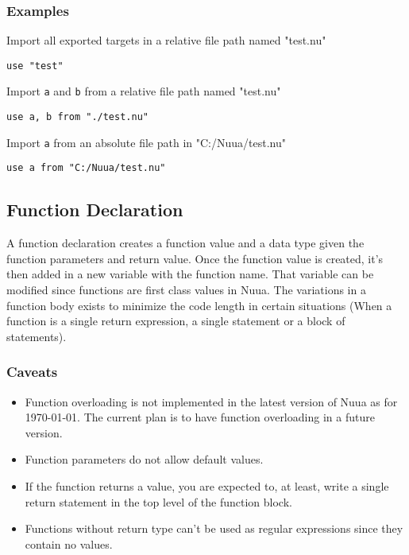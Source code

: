 \subsubsection{Examples}

Import all exported targets in a relative file path named "test.nu"
\begin{lstlisting}
use "test"
\end{lstlisting}
Import \texttt{a} and \texttt{b} from a relative file path named "test.nu"
\begin{lstlisting}
use a, b from "./test.nu"
\end{lstlisting}
Import \texttt{a} from an absolute file path in "C:/Nuua/test.nu"
\begin{lstlisting}
use a from "C:/Nuua/test.nu"
\end{lstlisting}

\subsection{Function Declaration}

A function declaration creates a function value and a data type given the function parameters and return value.
Once the function value is created, it's then added in a new variable with the function name. That variable can be
modified since functions are first class values in Nuua. The variations in a function body exists to minimize the
code length in certain situations (When a function is a single return expression, a single statement or a block of statements).

\subsubsection{Caveats}

\begin{itemize}
    \item Function overloading is not implemented in the latest version of Nuua as for \today. The current plan is to have
        function overloading in a future version.
    \item Function parameters do not allow default values.
    \item If the function returns a value, you are expected to, at least, write a single return statement in the top level of the
        function block.
    \item Functions without return type can't be used as regular expressions since they contain no values.
\end{itemize}

